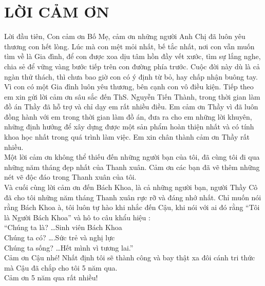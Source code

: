 \documentclass{article}
\begin{document}
\section*{LỜI CẢM ƠN}
\thispagestyle{empty}
Lời đầu tiên, Con cảm ơn Bố Mẹ, cảm ơn những người Anh Chị đã luôn yêu thương con hết lòng. Lúc mà con mệt mỏi nhất, bế tắc nhất, nơi con vẫn muốn tìm về là Gia đình, để con được xoa dịu tâm hồn đầy vết xước, tìm sự lắng nghe, chia sẻ để vững vàng bước tiếp trên con đường phía trước. Cuộc đời này dù là cả ngàn thử thách, thì chưa bao giờ con có ý định từ bỏ, hay chấp nhận buông tay. Vì con có một Gia đình luôn yêu thương, bên cạnh con vô điều kiện.
Tiếp theo em xin gửi lời cảm ơn sâu sắc đến ThS. Nguyễn Tiến Thành, trong thời gian làm đồ án Thầy đã hỗ trợ và chỉ dạy em rất nhiều điều. Em cảm ơn Thầy vì đã luôn đồng hành với em trong thời gian làm đồ án, đưa ra cho em những lời khuyên, những định hướng để xây dựng được một sản phẩm hoàn thiện nhất và có tính khoa học nhất trong quá trình làm việc. Em xin chân thành cảm ơn Thầy rất nhiều. \\
Một lời cảm ơn không thể thiếu đến những người bạn của tôi, đã cùng tôi đi qua những năm tháng đẹp nhất của Thanh xuân. Cảm ơn các bạn đã vẽ thêm những nét vẽ độc đáo trong Thanh xuân của tôi. \\
Và cuối cùng lời cảm ơn đến Bách Khoa, là cả những người bạn, người Thầy Cô đã cho tôi những năm tháng Thanh xuân rực rỡ và đáng nhớ nhất. Chỉ muốn nói rằng Bách Khoa à, tôi luôn tự hào khi nhắc đến Cậu, khi nói với ai đó rằng “Tôi là Người Bách Khoa” và hô to câu khẩu hiệu :\\
“Chúng ta là? …Sinh viên Bách Khoa\\
Chúng ta có? ….Sức trẻ và nghị lực\\
Chúng ta sống? …Hết mình vì tương lai.”\\
Cảm ơn Cậu nhé! Nhất định tôi sẽ thành công và bay thật xa đôi cánh tri thức mà Cậu đã chắp cho tôi 5 năm qua. \\
Cảm ơn 5 năm qua rất nhiều!
\cleardoublepage

\thispagestyle{empty}
\end{document}
